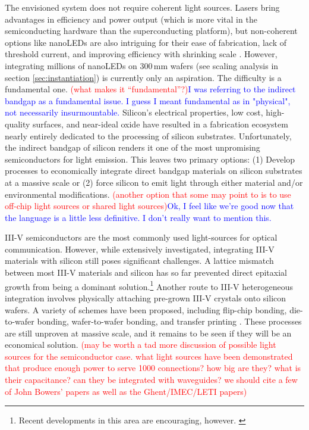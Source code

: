 \documentclass[twocolumn]{article}
\begin{document}
The envisioned system does not require coherent light sources. Lasers bring advantages in efficiency and power output (which is more vital in the semiconducting hardware than the superconducting platform), but non-coherent options like nanoLEDs are also intriguing for their ease of fabrication, lack of threshold current, and improving efficiency with shrinking scale \cite{romeira2019physical}. However, integrating millions of nanoLEDs on 300\,mm wafers (see scaling analysis in section \ref{sec:instantiation}) is currently only an aspiration. The difficulty is a fundamental one. \textcolor{red}{(what makes it ``fundamental''?)}\textcolor{blue}{I was referring to the indirect bandgap as a fundamental issue. I guess I meant fundamental as in "physical", not necessarily insurmountable.} Silicon's electrical properties, low cost, high-quality surfaces, and near-ideal oxide have resulted in a fabrication ecosystem nearly entirely dedicated to the processing of silicon substrates. Unfortunately, the indirect bandgap of silicon renders it one of the most unpromising semiconductors for light emission. This leaves two primary options: (1) Develop processes to economically integrate direct bandgap materials on silicon substrates at a massive scale or (2) force silicon to emit light through either material and/or environmental modifications. \textcolor{red}{(another option that some may point to is to use off-chip light sources or shared light sources)}\textcolor{blue}{Ok, I feel like we're good now that the language is a little less definitive. I don't really want to mention this.}

III-V semiconductors are the most commonly used light-sources for optical communication. However, while extensively investigated, integrating III-V materials with silicon still poses significant challenges. A lattice mismatch between most III-V materials and silicon has so far prevented direct epitaxial growth from being a dominant solution.\footnote{Recent developments in this area are encouraging, however. \cite{li2017epitaxial}} Another route to III-V heterogeneous integration involves physically attaching pre-grown III-V crystals onto silicon wafers. A variety of schemes have been proposed, including flip-chip bonding, die-to-wafer bonding, wafer-to-wafer bonding, and transfer printing \cite{zhang2019iii,more,references,jeff,has,a,bunch}. These processes are still unproven at massive scale, and it remains to be seen if they will be an economical solution. \textcolor{red}{(may be worth a tad more discussion of possible light sources for the semiconductor case. what light sources have been demonstrated that produce enough power to serve 1000 connections? how big are they? what is their capacitance? can they be integrated with waveguides? we should cite a few of John Bowers' papers as well as the Ghent/IMEC/LETI papers)}
\end{document}
